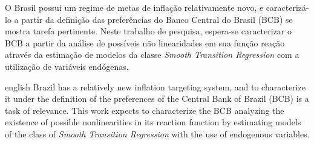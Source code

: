 \documentclass[
	article,			%
	11pt,				%
	oneside,			%
	a4paper,			%
	english,			%
	brazil,				%
	]{abntex2}
\begin{document}
  






\pagebreak
\setlength{\absparsep}{18pt} %
\begin{resumo}
 O Brasil possui um regime de metas de inflação relativamente novo, e caracterizá-lo a partir da definição das preferências do Banco Central do Brasil (BCB) se mostra tarefa pertinente. Neste trabalho de pesquisa, espera-se caracterizar o BCB a partir da análise de possíveis não linearidades em sua função reação através da estimação de modelos da classe \textit{Smooth Transition Regression} com a utilização de variáveis endógenas.

\end{resumo}

\pagebreak
\begin{resumo}[Abstract]
 \begin{otherlanguage*}{english}
   Brazil has a relatively new inflation targeting system, and to characterize it under the definition of the preferences of the Central Bank of Brazil (BCB) is a task of relevance. This work expects to characterize the BCB analyzing the existence of possible nonlinearities in its reaction function by estimating models of the class of \textit{Smooth Transition Regression} with the use of endogenous variables.

   \vspace{\onelineskip}
 
   \noindent 
 \end{otherlanguage*}
\end{resumo}
\end{document}
